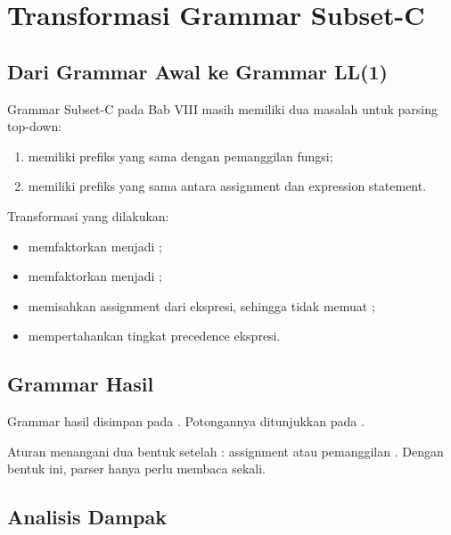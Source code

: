\section{Transformasi Grammar Subset-C}
\label{sec:ch09-subsetc}

\subsection{Dari Grammar Awal ke Grammar LL(1)}

Grammar Subset-C pada Bab VIII masih memiliki dua masalah untuk
parsing top-down:
\begin{enumerate}[label=\arabic*.,leftmargin=*]
  \item {} memiliki prefiks  yang sama dengan
        pemanggilan fungsi;
  \item {} memiliki prefiks  yang sama antara
        assignment dan expression statement.
\end{enumerate}

Transformasi yang dilakukan:
\begin{itemize}[leftmargin=*]
  \item memfaktorkan  menjadi
        ;
  \item memfaktorkan  menjadi
        ;
  \item memisahkan assignment dari ekspresi, sehingga
         tidak memuat ;
  \item mempertahankan tingkat precedence ekspresi.
\end{itemize}

\subsection{Grammar Hasil}

Grammar hasil disimpan pada . Potongannya
ditunjukkan pada .


Aturan  menangani dua bentuk setelah
: assignment  atau pemanggilan
\code{( [args] )}. Dengan bentuk ini, parser hanya perlu membaca
 sekali.

\subsection{Analisis Dampak}

